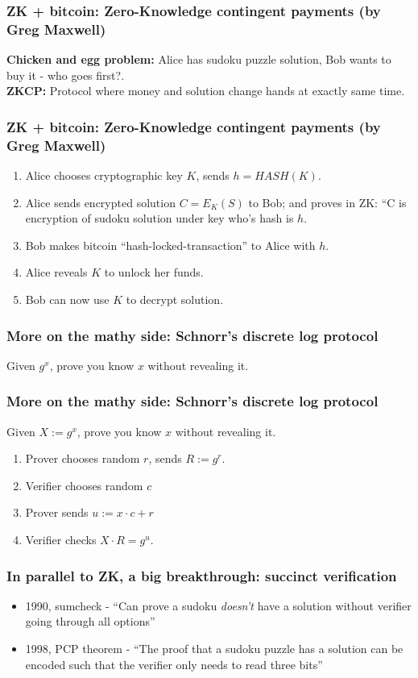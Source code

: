 \documentclass[shadesubsections,compress,14pt,mathserif]{beamer}
\newcommand{\defeq}{\ensuremath{:=}}
\begin{document}
\begin{frame}
  \frametitle{ZK + bitcoin: Zero-Knowledge contingent payments \small{(by Greg Maxwell)}}
\textbf{Chicken and egg problem:} Alice has sudoku puzzle solution, Bob wants to buy it - who goes first?.\\
 \vspace{0.4in}
\textbf{ZKCP:} Protocol where money and solution change hands at exactly same time.
 \vspace{0.4in}
\end{frame}


\begin{frame}
  \frametitle{ZK + bitcoin: Zero-Knowledge contingent payments \small{(by Greg Maxwell)}}
\begin{enumerate}
 \item Alice chooses cryptographic key  $K$, sends $h =HASH(K)$.\pause
 \item Alice sends encrypted solution $C=E_K(S)$ to Bob; and proves in ZK: ``C is encryption of sudoku solution under key who's hash is $h$.\pause
  \item Bob makes bitcoin ``hash-locked-transaction'' to Alice with $h$.\pause
 \item Alice reveals $K$ to unlock her funds.\pause
 \item Bob can now use $K$ to decrypt solution.\pause
\end{enumerate}

\end{frame}


\begin{frame}
  \frametitle{More on the mathy side: Schnorr's discrete log protocol}
Given $g^x$, prove you know $x$ without revealing it.
\end{frame}
\begin{frame}
  \frametitle{More on the mathy side: Schnorr's discrete log protocol}
Given $X\defeq g^x$, prove you know $x$ without revealing it.
\vspace{0.4in}
\begin{enumerate}
 \item Prover chooses random $r$, sends $R\defeq g^r$.\pause
 \item Verifier chooses random $c$\pause
 \item Prover sends $u\defeq x\cdot c +r$\pause
\item Verifier checks $X\cdot R = g^u$. 
\end{enumerate}

\end{frame}
\begin{frame}
 \frametitle{In parallel to ZK, a  big breakthrough: succinct verification}
 \begin{itemize}
  \item  1990, sumcheck - ``Can prove a sudoku \emph{doesn't} have a solution without verifier going through all options''\pause
  \item 1998, PCP theorem - ``The proof that a sudoku puzzle has a solution can be encoded such that the verifier only needs to read three bits'' 
 \end{itemize}

\end{frame}
\end{document}

